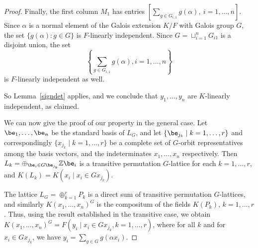 \documentclass[12pt]{article}
\theoremstyle{plain}
\newcommand{\Z}{\ensuremath{\mathbb{Z}}}
\begin{document}
\begin{proof}
  Finally, the first column $M_1$ has entries $[ \sum_{g \in
      G_{i,1}}g(\alpha),\ i = 1, \ldots,n ].$ Since $\alpha$ is a
  normal element of the Galois extension $K/F$ with Galois group $G$,
  the set $\lbrace g(\alpha): g \in G \rbrace$ is $F$-linearly
  independent. Since $G = \sqcup^n_{i =1}G_{i1}$ is a disjoint union,
  the set
  $$\left\lbrace \sum_{g \in G_{i,1}}g(\alpha), i = 1, \ldots, n \right\rbrace$$ is
  $F$-linearly independent as well.
  
  So Lemma~\ref{signdet} applies, and we conclude that $y_1, \ldots,
  y_n$ are $K$-linearly independent, as claimed.

  \medskip 
  
  We can now give the proof of our property in the general case.
  Let $\be_1, \ldots , \be_n$ be the standard basis of
  $L_G$, and let $\{\be_{j_k} \mid k = 1, \ldots, r\}$ and
  correspondingly $\{x_{j_k} \mid k = 1, \ldots, r\}$ be a complete set
  of $G$-orbit representatives among the basis vectors, and the
  indeterminates $x_1, \ldots, x_n$ respectively. Then $L_k = \oplus_{
    \be_i \in G \be_{j_{k}} } \Z \be_i$ is a
  transitive permutation $G$-lattice for each $k = 1, \ldots, r$, and
  $K(L_k) = K(x_i \mid x_i \in Gx_{j_k})$.
  
  The lattice $L_G = \oplus^r_{k =1} P_k$ is a direct sum of transitive
  permutation $G$-lattices, and similarly $K(x_1,\dots,x_n)^G$ is the
  compositum of the fields $K(P_k)$, $k=1,\dots,r$. Thus, using the 
  result established in the transitive case, we obtain
  $K(x_1,\dots,x_n)^G=F(y_i \mid x_i \in Gx_{j_k}, k=1,\dots,r)$, where
  for all $k$ and for $x_i \in Gx_{j_k}$, we have $y_i=\sum_{g \in G}
  g(\alpha x_i)$.
\end{proof}
\end{document}
